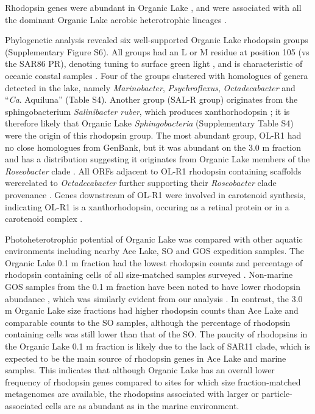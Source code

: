 Rhodopsin genes were abundant in Organic Lake , and were associated with all the dominant Organic Lake aerobic heterotrophic lineages . 

Phylogenetic analysis revealed six well-supported Organic Lake rhodopsin groups (Supplementary Figure S6). 
All groups had an L or M residue at position 105 (vs the SAR86 \ac{PR}), denoting tuning to surface green light \cite{Man2003, Gomez-Consarnau2007}, and is characteristic of oceanic coastal samples \cite{Rusch2007}. 
Four of the groups clustered with homologues of genera detected in the lake, namely \emph{Marinobacter}, \emph{Psychroflexus}, \emph{Octadecabacter} and ``\emph{Ca}. Aquiluna''  (Table S4). 
Another group (SAL-R group) originates from the sphingobacterium \emph{Salinibacter ruber}, which produces xanthorhodopsin \cite{Balashov2005}; it is therefore likely that Organic Lake \emph{Sphingobacteria} (Supplementary Table S4) were the origin of this rhodopsin group. 
The most abundant group, OL-R1  had no close homologues from GenBank, but it was abundant on the 3.0 \textmu{}m fraction and has a distribution suggesting it originates from Organic Lake members of the \emph{Roseobacter} clade . 
All \acp{ORF} adjacent to OL-R1 rhodopsin containing scaffolds wererelated to \emph{Octadecabacter} further supporting their \emph{Roseobacter} clade provenance . 
Genes downstream of OL-R1 were involved in carotenoid synthesis, indicating OL-R1 is a xanthorhodopsin, occuring as a retinal protein or in a carotenoid complex \cite{Balashov2005}. %


Photoheterotrophic potential of Organic Lake was compared with other aquatic environments including nearby Ace Lake, \ac{SO} and \ac{GOS} expedition samples. 
The Organic Lake 0.1 \textmu{}m fraction had the lowest rhodopsin counts and percentage of rhodopsin containing cells of all size-matched samples surveyed . 
Non-marine \ac{GOS} samples from the 0.1 \textmu{}m fraction have been noted to have lower rhodopsin abundance \cite{Sharma2008}, which was similarly evident from our analysis . 
In contrast, the 3.0 \textmu{}m Organic Lake size fractions had higher rhodopsin counts than Ace Lake and comparable counts to the \ac{SO} samples, although the percentage of rhodopsin containing cells was still lower than that of the \ac{SO}. 
The paucity of rhodopsins in the Organic Lake 0.1 \textmu{}m fraction is likely due to the lack of SAR11 clade, which is expected to be the main source of rhodopsin genes in Ace Lake and marine samples. 
This indicates that although Organic Lake has an overall lower frequency of rhodopsin genes compared to sites for which size fraction-matched metagenomes are available, the rhodopsins associated with larger or particle-associated cells are as abundant as in the marine environment.


